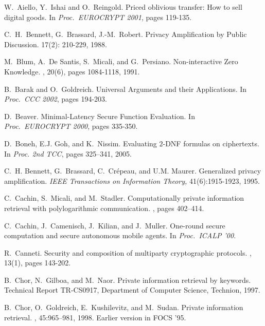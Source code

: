 \documentclass[11pt]{article}
\begin{document}
\begin{thebibliography}{10}
W.~Aiello, Y.~Ishai and O.~Reingold.
\newblock Priced oblivious transfer: How to sell digital goods.
\newblock In {\em Proc.\ EUROCRYPT 2001}, pages 119-135.

 C.~H.~Bennett, G.~Brassard, J.-M.~Robert.
\newblock Privacy Amplification by Public Discussion.
 17(2): 210-229, 1988.

M.~Blum, A.~De Santis, S.~Micali, and G.~Persiano.
\newblock Non-interactive Zero Knowledge.
, 20(6), pages 1084-1118,
1991.

B.~Barak and O.~Goldreich.
\newblock  Universal Arguments and their
Applications.
\newblock In {\em Proc.\ CCC 2002}, pages 194-203.

D.~Beaver.
\newblock Minimal-Latency Secure Function Evaluation.
\newblock In {\em Proc.\ EUROCRYPT 2000}, pages 335-350.

D.~Boneh, E.J. Goh, and K.~Nissim.
\newblock Evaluating $2$-{DNF} formulas on ciphertexts.
\newblock In {\em Proc. 2nd TCC}, pages 325--341, 2005.

 C.~H. Bennett, G.~Brassard, C.~Cr{\'e}peau, and U.M.
Maurer.
\newblock Generalized privacy amplification. {\em IEEE Transactions on
Information Theory,} 41(6):1915-1923, 1995.

C.~Cachin, S.~Micali, and M.~Stadler.
\newblock Computationally private information retrieval with polylogarithmic
  communication.
, pages 402--414.

C.~Cachin, J.~Camenisch, J.~Kilian, and J.~Muller.
\newblock One-round secure computation and secure autonomous mobile agents.
\newblock In {\em Proc.\ ICALP '00}.

R.~Canneti.
\newblock Security and composition of multiparty cryptographic protocols.
, 13(1), pages 143-202.

B.~Chor, N.~Gilboa, and M.~Naor.
\newblock Private information retrieval by keywords.
\newblock Technical Report TR-CS0917, Department of Computer Science, Technion,
  1997.

B.~Chor, O.~Goldreich, E.~Kushilevitz, and M.~Sudan.
\newblock Private information retrieval.
, 45:965--981, 1998.
\newblock Earlier version in FOCS '95.


\end{thebibliography}
\end{document}
